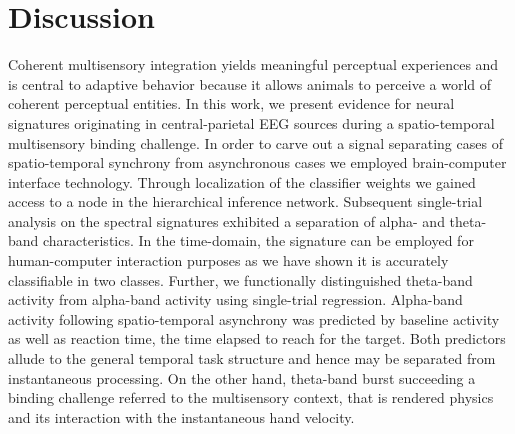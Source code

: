 \section{Discussion}%
Coherent multisensory integration yields meaningful perceptual experiences and is central to adaptive behavior because it allows animals to perceive a world of coherent perceptual entities. In this work, we present evidence for neural signatures originating in central-parietal EEG sources during a spatio-temporal multisensory binding challenge. In order to carve out a signal separating cases of spatio-temporal synchrony from asynchronous cases we employed brain-computer interface technology. Through localization of the classifier weights we gained access to a node in the hierarchical inference network. Subsequent single-trial analysis on the spectral signatures exhibited a separation of alpha- and theta-band characteristics. In the time-domain, the signature can be employed for human-computer interaction purposes as we have shown it is accurately classifiable in two classes. Further, we functionally distinguished theta-band activity from alpha-band activity using single-trial regression. Alpha-band activity following spatio-temporal asynchrony was predicted by baseline activity as well as reaction time, the time elapsed to reach for the target. Both predictors allude to the general temporal task structure and hence may be separated from instantaneous processing. On the other hand, theta-band burst succeeding a binding challenge referred to the multisensory context, that is rendered physics and its interaction with the instantaneous hand velocity.



